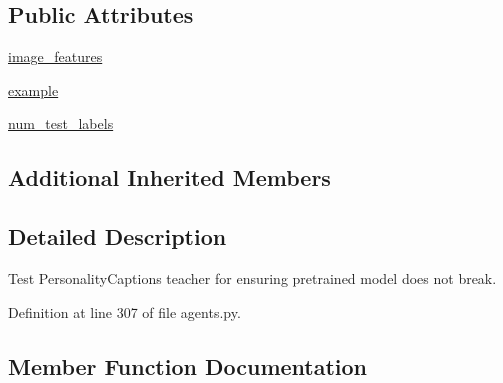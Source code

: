 \subsection*{Public Attributes}
\begin{DoxyCompactItemize}
\item 
\hyperlink{classparlai_1_1tasks_1_1personality__captions_1_1agents_1_1PersonalityCaptionsTestTeacher_a3b99c22797205aaf11f652bd28c314c3}{image\+\_\+features}
\item 
\hyperlink{classparlai_1_1tasks_1_1personality__captions_1_1agents_1_1PersonalityCaptionsTestTeacher_a183b3779c4ce45111f608a263e8147a5}{example}
\item 
\hyperlink{classparlai_1_1tasks_1_1personality__captions_1_1agents_1_1PersonalityCaptionsTestTeacher_aa2232ceb48d0dd2f67e8f15ac0a549e0}{num\+\_\+test\+\_\+labels}
\end{DoxyCompactItemize}
\subsection*{Additional Inherited Members}


\subsection{Detailed Description}
\begin{DoxyVerb}Test PersonalityCaptions teacher for ensuring pretrained model does not break.
\end{DoxyVerb}
 

Definition at line 307 of file agents.\+py.



\subsection{Member Function Documentation}
\mbox{\label{classparlai_1_1tasks_1_1personality__captions_1_1agents_1_1PersonalityCaptionsTestTeacher_a07f538c8c1ff16a9d08b78d1ea3ef1f8}} 
